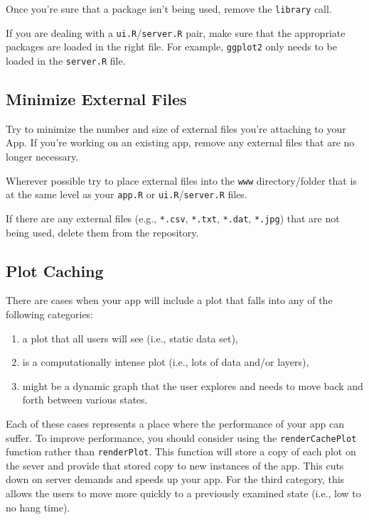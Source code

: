 \documentclass[
]{book}
\providecommand{\tightlist}{%
  \setlength{\itemsep}{0pt}\setlength{\parskip}{0pt}}
\begin{document}
Once you're sure that a package isn't being used, remove the \texttt{library} call.

If you are dealing with a \texttt{ui.R}/\texttt{server.R} pair, make sure that the appropriate packages are loaded in the right file. For example, \texttt{ggplot2} only needs to be loaded in the \texttt{server.R} file.

\hypertarget{exFiles}{%
\subsection{Minimize External Files}\label{exFiles}}

Try to minimize the number and size of external files you're attaching to your App. If you're working on an existing app, remove any external files that are no longer necessary.

Wherever possible try to place external files into the \texttt{www} directory/folder that is at the same level as your \texttt{app.R} or \texttt{ui.R}/\texttt{server.R} files.

If there are any external files (e.g., \texttt{*.csv}, \texttt{*.txt}, \texttt{*.dat}, \texttt{*.jpg}) that are not being used, delete them from the repository.

\hypertarget{plotCache}{%
\subsection{Plot Caching}\label{plotCache}}

There are cases when your app will include a plot that falls into any of the following categories:

\begin{enumerate}
\def\labelenumi{\arabic{enumi})}
\tightlist
\item
  a plot that all users will see (i.e., static data set),
\item
  is a computationally intense plot (i.e., lots of data and/or layers),
\item
  might be a dynamic graph that the user explores and needs to move back and forth between various states.
\end{enumerate}

Each of these cases represents a place where the performance of your app can suffer. To improve performance, you should consider using the \texttt{renderCachePlot} function rather than \texttt{renderPlot}. This function will store a copy of each plot on the sever and provide that stored copy to new instances of the app. This cuts down on server demands and speeds up your app. For the third category, this allows the users to move more quickly to a previously examined state (i.e., low to no hang time).
\end{document}
